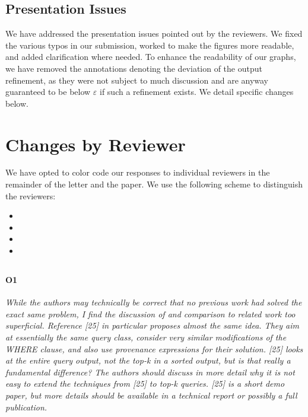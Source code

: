 \documentclass[main.tex]{subfile}
\begin{document}
\subsection*{Presentation Issues}
We have addressed the presentation issues pointed out by the reviewers. We fixed the various typos in our submission, worked to make the figures more readable, and added clarification where needed.%
\indent To enhance the readability of our graphs, we have removed the annotations denoting the deviation of the output refinement, %
as they were not subject to much discussion and are anyway guaranteed to be below $\varepsilon$ if such a refinement exists.  We detail specific changes below.

\section*{Changes by Reviewer}
We have opted to color code our responses to individual reviewers in the remainder of the letter and the paper. We use the following scheme to distinguish the reviewers:
\begin{itemize}
    \item {}
    \item {}
    \item {}
    \item {}
\end{itemize}

\subsection*{}
\paragraph*{{\bf O1}} 
{\it While the authors may technically be correct that no previous work had solved the exact same problem, I find the discussion of and comparison to related work too superficial. Reference [25] in particular proposes almost the same idea. They aim at essentially the same query class, consider very similar modifications of the WHERE clause, and also use provenance expressions for their solution. [25] looks at the entire query output, not the top-k in a sorted output, but is that really a fundamental difference? The authors should discuss in more detail why it is not easy to extend the techniques from [25] to top-k queries. [25] is a short demo paper, but more details should be available in a technical report or possibly a full publication.}
\end{document}
